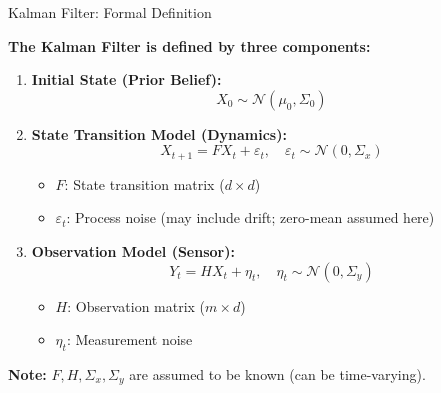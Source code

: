 \documentclass[handout,aspectratio=169]{beamer}
\begin{document}
\begin{frame}{Kalman Filter: Formal Definition}

\textbf{The Kalman Filter is defined by three components:}

\begin{enumerate}
  \item \textbf{Initial State (Prior Belief):}
  \[
    X_0 \sim \mathcal{N}(\mu_0, \Sigma_0) \tag{3.1}
  \]

  \item \textbf{State Transition Model (Dynamics):}
  \[
    X_{t+1} = F X_t + \varepsilon_t, \quad \varepsilon_t \sim \mathcal{N}(0, \Sigma_x) \tag{3.2}
  \]
  \begin{itemize}
    \item \( F \): State transition matrix (\( d \times d \))
    \item \( \varepsilon_t \): Process noise (may include drift; zero-mean assumed here)
  \end{itemize}

  \item \textbf{Observation Model (Sensor):}
  \[
    Y_t = H X_t + \eta_t, \quad \eta_t \sim \mathcal{N}(0, \Sigma_y) \tag{3.3}
  \]
  \begin{itemize}
    \item \( H \): Observation matrix (\( m \times d \))
    \item \( \eta_t \): Measurement noise
  \end{itemize}
\end{enumerate}

\textbf{Note:} \( F, H, \Sigma_x, \Sigma_y \) are assumed to be known (can be time-varying).

\end{frame}
\end{document}

